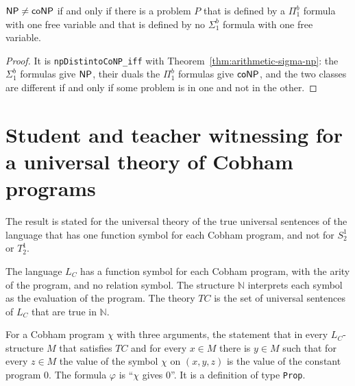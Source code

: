 \begin{theorem}
  \label{thm:arithmetic-np-conp-formulas}
  \leanok
  $\mathsf{NP} \ne \mathsf{coNP}$ if and only if there is a problem $P$ that is defined by a $\Pi^b_1$ formula with
  one free variable and that is defined by no $\Sigma^b_1$ formula with one free variable.
  \own{}
\end{theorem}

\begin{proof}
  \leanok
  It is \texttt{npDistintoCoNP\_iff} with Theorem~\ref{thm:arithmetic-sigma-np}: the $\Sigma^b_1$
  formulas give $\mathsf{NP}$, their duals the $\Pi^b_1$ formulas give $\mathsf{coNP}$, and the two classes are
  different if and only if some problem is in one and not in the other.
\end{proof}

\section{Student and teacher witnessing for a universal theory of Cobham programs}
\label{sec:arithmetic-kpt}

The result is stated for the universal theory of the true universal sentences of the language that has
one function symbol for each Cobham program, and not for $S^1_2$ or $T^1_2$.

\begin{definition}
  \label{def:arithmetic-tc}
  \leanok
  \own{}
  \infrastructure{}
  The language $L_C$ has a function symbol for each Cobham program, with the arity of the program,
  and no relation symbol. The structure $\mathbb{N}$ interprets each symbol as the evaluation of the
  program. The theory $TC$ is the set of universal sentences of $L_C$ that are true in $\mathbb{N}$.
\end{definition}

\begin{definition}
  \label{def:arithmetic-hyp-aea}
  \leanok
  For a Cobham program $\chi$ with three arguments, the statement that in every $L_C$-structure $M$
  that satisfies $TC$ and for every $x \in M$ there is $y \in M$ such that for every $z \in M$ the
  value of the symbol $\chi$ on $(x, y, z)$ is the value of the constant program $0$. The formula
  $\varphi$ is ``$\chi$ gives $0$''. It is a definition of type \texttt{Prop}.
\end{definition}

